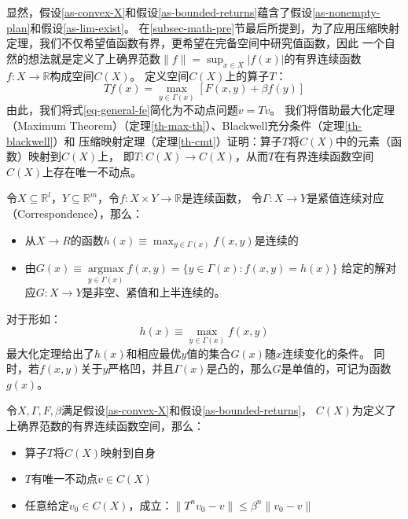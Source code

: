 显然，假设\ref{as-convex-X}和假设\ref{as-bounded-returns}蕴含了假设\ref{as-nonempty-plan}和假设\ref{as-lim-exist}。
在\ref{subsec-math-pre}节最后所提到，为了应用压缩映射定理，我们不仅希望值函数有界，更希望在完备空间中研究值函数，因此
一个自然的想法就是定义了上确界范数$\|f\|=\sup _{x\in X}|f\left(x\right)|$的有界连续函数$f: X\rightarrow \mathbb{R}$构成空间$C\left(X\right)$。
定义空间$C\left(X\right)$上的算子$T$：
\begin{equation}
    Tf\left(x\right)=\max_{y\in\Gamma\left(x\right)}\left[F\left(x,y\right)+\beta f\left(y\right)\right]
\end{equation}
由此，我们将式\ref{eq-general-fe}简化为不动点问题$v=Tv$。
我们将借助最大化定理（Maximum Theorem）（定理\ref{th-max-th}）、Blackwell充分条件（定理\ref{th-blackwell}）和
压缩映射定理（定理\ref{th-cmt}）证明：算子$T$将$C\left(X\right)$中的元素（函数）映射到$C\left(X\right)$上，
即$T: C\left(X\right)\rightarrow C\left(X\right)$，从而$T$在有界连续函数空间$C\left(X\right)$上存在唯一不动点。

\begin{theorem}    \label{th-max-th}
    令$X\subseteq\mathbb{R}^l$，$Y\subseteq\mathbb{R}^m$，令$f: X\times Y \rightarrow \mathbb{R}$是连续函数，
    令$\Gamma: X\rightarrow Y$是紧值连续对应（Correspondence），那么：
    \begin{itemize}
        \item 从$X\rightarrow R$的函数$h\left(x\right)\equiv \max _{y\in\Gamma\left(x\right)}f\left(x,y\right)$是连续的
        \item 由$G(x) \equiv \underset{y \in \Gamma(x)}{\operatorname{argmax}} f(x, y)=\{y \in \Gamma(x): f(x, y)=h(x)\}$
        给定的解对应$G: X\rightarrow Y$是非空、紧值和上半连续的。
    \end{itemize}
\end{theorem}
对于形如：
\begin{equation*}
    h\left(x\right)\equiv \max_{y\in\Gamma\left(x\right)}f\left(x,y\right)
\end{equation*}
最大化定理给出了$h\left(x\right)$和相应最优$y$值的集合$G\left(x\right)$随$x$连续变化的条件。
同时，若$f\left(x,y\right)$关于$y$严格凹，并且$\Gamma\left(x\right)$是凸的，那么$G$是单值的，可记为函数$g\left(x\right)$。

\begin{theorem}[$FE$问题解的存在及唯一性] \label{th-fe-solution-exist}
    令$X, \Gamma, F, \beta$满足假设\ref{as-convex-X}和假设\ref{as-bounded-returns}，
    $C\left(X\right)$为定义了上确界范数的有界连续函数空间，那么：
    \begin{itemize}
        \item 算子$T$将$C\left(X\right)$映射到自身
        \item $T$有唯一不动点$v\in C\left(X\right)$
        \item 任意给定$v_0\in C\left(X\right)$，成立：$\|T^nv_0-v\|\leq \beta^n \|v_0-v\|$
    \end{itemize}
\end{theorem}

